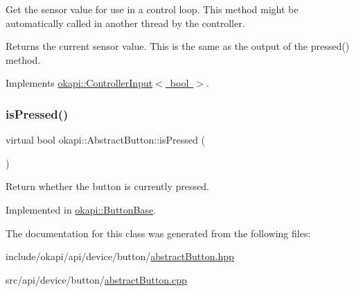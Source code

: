 Get the sensor value for use in a control loop. This method might be automatically called in another thread by the controller.

\begin{DoxyReturn}{Returns}
the current sensor value. This is the same as the output of the pressed() method. 
\end{DoxyReturn}


Implements \mbox{\hyperlink{classokapi_1_1ControllerInput_a3c6c86d897983f367928a93890551e17}{okapi\+::\+Controller\+Input$<$ bool $>$}}.

\mbox{\label{classokapi_1_1AbstractButton_aea582f04f6ec3f5714b285421d2db66e}} 
\subsubsection{\texorpdfstring{isPressed()}{isPressed()}}
{\footnotesize\ttfamily virtual bool okapi\+::\+Abstract\+Button\+::is\+Pressed (\begin{DoxyParamCaption}{ }\end{DoxyParamCaption})\hspace{0.3cm}{\ttfamily [pure virtual]}}

Return whether the button is currently pressed. 

Implemented in \mbox{\hyperlink{classokapi_1_1ButtonBase_a82f27002395801e0d1a6c3213b6454f4}{okapi\+::\+Button\+Base}}.



The documentation for this class was generated from the following files\+:\begin{DoxyCompactItemize}
\item 
include/okapi/api/device/button/\mbox{\hyperlink{abstractButton_8hpp}{abstract\+Button.\+hpp}}\item 
src/api/device/button/\mbox{\hyperlink{abstractButton_8cpp}{abstract\+Button.\+cpp}}\end{DoxyCompactItemize}
